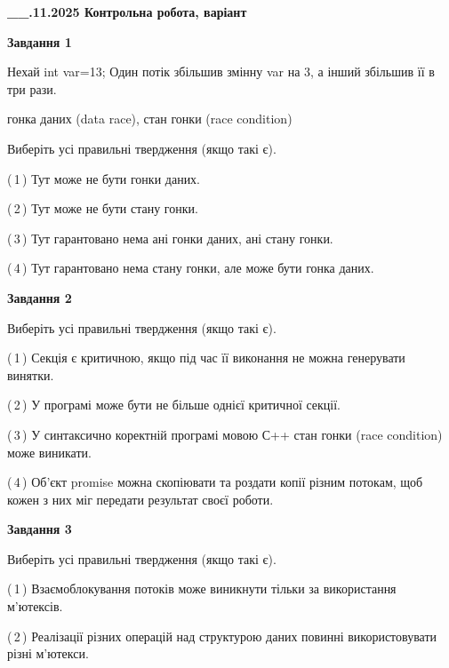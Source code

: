 \documentclass[12pt, ukrainian]{article}
\begin{document}
\begin {large}

\textbf{\_\_.11.2025 Контрольна робота, варіант  }\par


{

\begin{center}
\textbf{Завдання 1}
\end{center}
Нехай int var=13; Один потік збільшив змінну var на 3, а інший збільшив її в три рази.

гонка даних (data race), стан гонки (race condition)

Виберіть усі правильні твердження (якщо такі є).\par
\vspace{2mm}
(\,1\,) Тут може не бути гонки даних.%

(\,2\,) Тут може не бути стану гонки.%

(\,3\,) Тут гарантовано нема ані гонки даних, ані стану гонки.%

(\,4\,) Тут гарантовано нема стану гонки, але може бути гонка даних.%



\begin{center}
\textbf{Завдання 2}
\end{center}
Виберіть усі правильні твердження (якщо такі є).\par
\vspace{2mm}

(\,1\,) Секція є критичною, якщо під час її виконання не можна генерувати винятки.%

(\,2\,) У програмі може бути не більше однієї критичної секції.%

(\,3\,) У синтаксично коректній програмі мовою С++ стан гонки (race condition) може виникати.%

(\,4\,) Об’єкт promise можна скопіювати та роздати копії різним потокам, щоб кожен з них міг передати результат своєї роботи.%



\begin{center}
\textbf{Завдання 3}
\end{center}
Виберіть усі правильні твердження (якщо такі є).\par
\vspace{2mm}

(\,1\,) Взаємоблокування потоків може виникнути тільки за використання м’ютексів.%

(\,2\,) Реалізації різних операцій над структурою даних повинні використовувати різні м’ютекси.%

}
\end{large}
\end{document}
